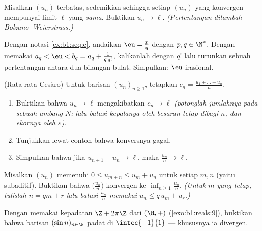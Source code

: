 \begin{exercise}[$\star\star$]\label{exo:b1:seq:8}
Misalkan $(u_n)$ terbatas, sedemikian sehingga setiap 
$(u_n)$ yang konvergen mempunyai limit $\ell$ yang \emph{sama}. Buktikan $u_n \to \ell$.
\emph{(Pertentangan ditambah Bolzano--Weierstrass.)}
\end{exercise}

\begin{exercise}[$\star\star\star$]\label{exo:b1:seq:9}
Dengan notasi \cref{ex:b1:seq:e}, andaikan $\eu = \frac pq$
dengan $p, q \in \N^*$. Dengan memakai $a_q < \eu < b_q = a_q + \frac{1}{q\,
q!}$, kalikanlah dengan $q!$ lalu turunkan sebuah pertentangan antara dua
bilangan bulat. Simpulkan: $\eu$ irasional.
\end{exercise}

\begin{exercise}[$\star\star\star$]\label{exo:b1:seq:10}
(Rata-rata Cesàro) Untuk barisan $(u_n)_{n \geq 1}$, tetapkan $c_n =
\frac{u_1 + \dots + u_n}{n}$.
\begin{enumerate}
  \item Buktikan bahwa $u_n \to \ell$ mengakibatkan $c_n \to \ell$ \emph{(potonglah
        jumlahnya pada sebuah ambang $N$; lalu batasi kepalanya oleh besaran
        tetap dibagi $n$, dan ekornya oleh $\varepsilon$)}.
  \item Tunjukkan lewat contoh bahwa konversnya gagal.
  \item Simpulkan bahwa jika $u_{n+1} - u_n \to \ell$, maka $\frac{u_n}{n}
        \to \ell$.
\end{enumerate}
\end{exercise}

\begin{exercise}[$\star\star\star$]\label{exo:b1:seq:11}
Misalkan $(u_n)$ memenuhi $0 \leq u_{m+n} \leq u_m + u_n$ untuk setiap $m, n$
(yaitu subaditif). Buktikan bahwa $\bigl(\frac{u_n}{n}\bigr)$ konvergen ke
$\inf_{n \geq 1} \frac{u_n}{n}$. \emph{(Untuk $m$ yang tetap, tulislah $n = qm
+ r$ lalu batasi $\frac{u_n}{n}$ memakai $u_n \leq q\,u_m + u_r$.)}
\end{exercise}

\begin{exercise}[$\star\star\star$]\label{exo:b1:seq:12}
Dengan memakai kepadatan  $\Z + 2\pi\Z$ dari $(\R, +)$
(\cref{exo:b1:reals:9}), buktikan bahwa barisan $(\sin n)_{n \in
\N}$ padat di $\intcc{-1}{1}$ --- khususnya ia divergen.
\end{exercise}

